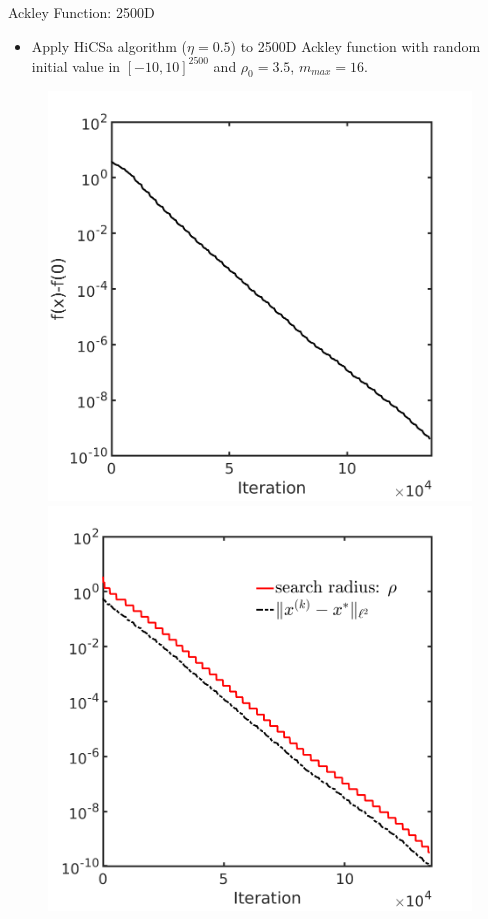 \documentclass{beamer}
\begin{document}
\begin{frame}{Ackley Function: 2500D}
\footnotesize{
	\begin{itemize}
		\item Apply HiCSa algorithm ($\eta=0.5$) to 2500D Ackley function with
			random initial value in  $[-10,10]^{2500}$ and $\rho_0 = 3.5$, $m_{max}=16$.
	\end{itemize}
	}
\begin{figure}[!htbp]
	\centering
	  \includegraphics[scale=0.2]{./figures/ackley2500D.png}
	  \includegraphics[scale=0.2]{./figures/ackley2500D_dist.png}
\end{figure}


\end{frame}
\end{document}
